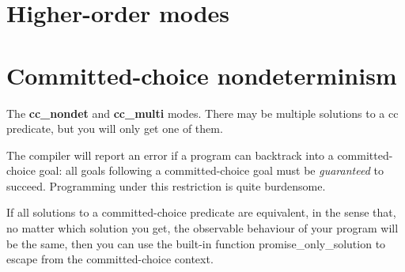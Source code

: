 \documentclass[a4paper,11pt,notitlepage,onecolumn]{book}
\begin{document}
\section{Higher-order modes}


\section{Committed-choice nondeterminism}


The \textsf{\textbf{cc\_nondet}} and \textsf{\textbf{cc\_multi}} modes.  There may be multiple solutions to a
cc predicate, but you will only get one of them.

The compiler will report an error if a program can backtrack into a
committed-choice goal: all goals following a committed-choice goal must be
\emph{guaranteed} to succeed.  Programming under this restriction is quite
burdensome.

If all solutions to a committed-choice predicate are equivalent, in the
sense that, no matter which solution you get, the observable behaviour of
your program will be the same, then you can use the built-in function
\textsf{promise\_only\_solution} to escape from the committed-choice context.
\end{document}
